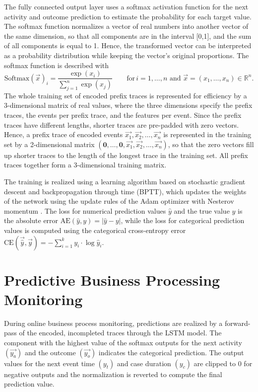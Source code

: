The fully connected output layer uses a softmax activation function for the next activity and outcome prediction to estimate the probability for each target value.
The softmax function normalizes a vector of real numbers into another vector of the same dimension, so that all components are in the interval [0,1], and the sum of all components is equal to 1.
Hence, the transformed vector can be interpreted as a probability distribution while keeping the vector’s original proportions.
The softmax function is described with
\begin{equation*}\label{key}
	\text{Softmax}(\vec{x})_i = \frac{\exp(x_i)}{\sum_{j=1}^{n} \exp(x_j)}  \qquad \text{for} \, i = 1, \dots, n \text{ and } \vec{x}=(x_1, \dots, x_n) \in \mathbb{R}^n.
\end{equation*}
The whole training set of encoded prefix traces is represented for efficiency by a 3-dimensional matrix of real values, where the three dimensions specify the prefix traces, the events per prefix trace, and the features per event.
Since the prefix traces have different lengths, shorter traces are pre-padded \cite{DBLP:journals/corr/abs-1903-07288} with zero vectors.
Hence, a prefix trace of encoded events $\vec{x_1}, \vec{x_2}, \dots, \vec{x_n}$  is represented in the training set by a 2-dimensional matrix $(\mathbf{0}, \dots, \mathbf{0},\vec{x_1}, \vec{x_2}, \dots, \vec{x_n})$, so that the zero vectors fill up shorter traces to the length of the longest trace in the training set.
All prefix traces together form a 3-dimensional training matrix.

The training is realized using a learning algorithm based on stochastic gradient descent and backpropagation through time (BPTT), which updates the weights of the network using the update rules of the Adam optimizer with Nesterov momentum \cite{dozat2016incorporating}.
The loss for numerical prediction values $\hat{y}$ and the true value $y$ is the absolute error $\text{AE}(\hat{y},y)=|\hat{y} - y|$, while the loss for categorical prediction values is computed using the categorical cross-entropy error $\text{CE}(\vec{\hat{y}}, \vec{y}) = - \sum_{i=1}^{k} y_i \cdot \log \hat{y}_i$.

\section{Predictive Business Processing Monitoring}

During online business process monitoring, predictions are realized by a forward-pass of the encoded, incompleted traces through the LSTM model.
The component with the highest value of the softmax outputs for the next activity $(\vec{y_a})$ and the outcome $(\vec{y_o})$ indicates the categorical prediction.
The output values for the next event time $(y_t)$ and case duration  $(y_c)$ are clipped to 0 for negative outputs and the normalization is reverted to compute the final prediction value.

